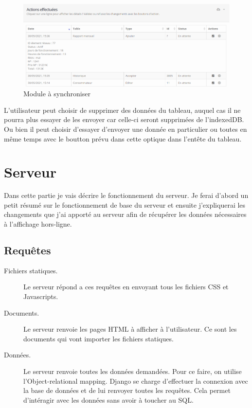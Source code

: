 \documentclass{EPL-master-thesis-covers-FR}
\begin{document}
				\begin{figure}[H]
					\centering
					\includegraphics[width=1\textwidth]{images/tosync}
					\caption{Module à synchroniser}
					\label{fig:tosync}
				\end{figure}
							
				L'utilisateur peut choisir de supprimer des données du tableau, auquel cas il ne pourra plus essayer de les envoyer car celle-ci seront supprimées de l'indexedDB. Ou bien il peut choisir d'essayer d'envoyer une donnée en particulier ou toutes en même temps avec le boutton prévu dans cette optique dans l'entête du tableau.
			
		
		\section{Serveur}
		\label{sec:serveur}
			Dans cette partie je vais décrire le fonctionnement du serveur. Je ferai d'abord un petit résumé sur le fonctionnement de base du serveur et ensuite j'expliquerai les changements que j'ai apporté au serveur afin de récupérer les données nécessaires à l'affichage hors-ligne.
			
			\subsection*{Requêtes}
				\begin{description}
					\item[Fichiers statiques.] Le serveur répond a ces requêtes en envoyant tous les fichiers CSS et Javascripts.
					\item[Documents.] Le serveur renvoie les pages HTML à afficher à l'utilisateur. Ce sont les documents qui vont importer les fichiers statiques.
					\item[Données.] Le serveur renvoie toutes les données demandées. Pour ce faire, on utilise l'Object-relational mapping. Django se charge d'effectuer la connexion avec la base de données et de lui renvoyer toutes les requêtes. Cela permet d'intéragir avec les données sans avoir à toucher au SQL.
				\end{description}
\end{document}
